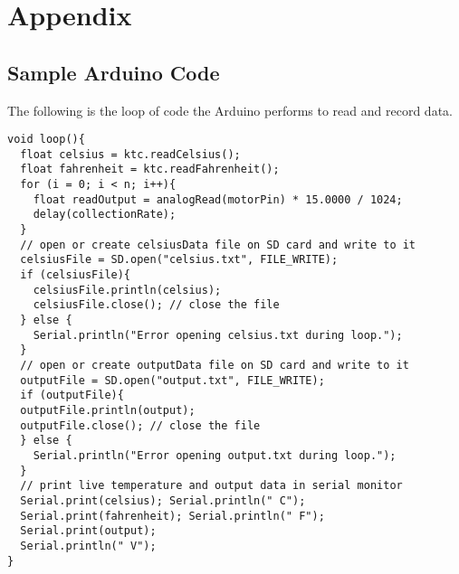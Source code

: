 \chapter{Appendix}

\section{Sample Arduino Code}

The following is the loop of code the Arduino performs to read and record data.

\begin{verbatim}
void loop(){  
  float celsius = ktc.readCelsius();
  float fahrenheit = ktc.readFahrenheit();
  for (i = 0; i < n; i++){
    float readOutput = analogRead(motorPin) * 15.0000 / 1024;
    delay(collectionRate);
  }
  // open or create celsiusData file on SD card and write to it
  celsiusFile = SD.open("celsius.txt", FILE_WRITE);
  if (celsiusFile){
    celsiusFile.println(celsius);
    celsiusFile.close(); // close the file
  } else {
    Serial.println("Error opening celsius.txt during loop.");
  }
  // open or create outputData file on SD card and write to it
  outputFile = SD.open("output.txt", FILE_WRITE);
  if (outputFile){
  outputFile.println(output);
  outputFile.close(); // close the file
  } else {
    Serial.println("Error opening output.txt during loop.");
  }
  // print live temperature and output data in serial monitor
  Serial.print(celsius); Serial.println(" C");
  Serial.print(fahrenheit); Serial.println(" F");
  Serial.print(output);
  Serial.println(" V");
}
\end{verbatim}